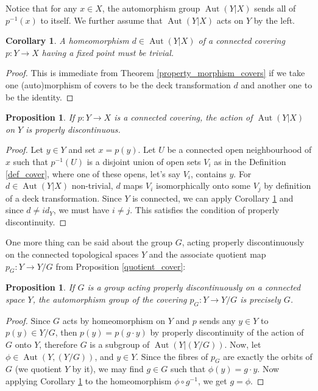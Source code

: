 \documentclass{article}
\theoremstyle{plain}
\newtheorem{proposition}[theorem]{Proposition}
\newtheorem{corollary}[theorem]{Corollary}
\theoremstyle{definition}
\DeclareMathOperator{\Aut}{Aut}
\begin{document}
\noindent Notice that for any $x\in X$, the automorphism group $\Aut(Y|X)$ sends all of $p^{-1}(x)$ to itself. We further assume that $\Aut(Y|X)$ acts on $Y$ by the left.

\begin{corollary}
\label{corollary_property_morphism_covers}
    A homeomorphism $d\in \Aut(Y|X)$ of a connected covering $p:Y\rightarrow X$ having a fixed point must be trivial.
\end{corollary}
\begin{proof}
    This is immediate from Theorem \ref{property_morphism_covers} if we take one (auto)morphism of covers to be the deck transformation $d$ and another one to be the identity.
\end{proof}


    
\begin{proposition}
    If $p:Y\rightarrow X$ is a connected covering, the action of $\Aut(Y|X)$ on $Y$ is properly discontinuous.
\end{proposition}
\begin{proof}
    Let $y\in Y$ and set $x = p(y)$. Let $U$ be a connected open neighbourhood of $x$ such that $p^{-1}(U)$ is a disjoint union of open sets $V_i$ as in the Definition \ref{def_cover}, where one of these opens, let's say $V_i$, contains $y$. 
    For $d\in \Aut(Y|X)$ non-trivial, $d$ maps $V_i$ isomorphically onto some $V_j$ by definition of a deck transformation. Since $Y$ is connected, we can apply Corollary \ref{corollary_property_morphism_covers} and since $d\neq id_Y$, we must have $i\neq j$. This satisfies the condition of properly discontinuity.
\end{proof}

\noindent One more thing can be said about the group $G$, acting properly discontinuously on the connected topological spaces $Y$ and the associate quotient map $p_G:Y\rightarrow Y/G$ from Proposition \ref{quotient_cover}:

\begin{proposition}
\label{G_is_aut_group}
    If $G$ is a group acting properly discontinuously on a connected space $Y$, the automorphism group of the covering $p_G:Y\rightarrow Y/G$ is precisely $G$.
\end{proposition}
\begin{proof}
    Since $G$ acts by homeomorphism on $Y$ and $p$ sends any $y\in Y$ to $p(y)\in Y/G$, then $p(y) = p(g\cdot y)$ by properly discontinuity of the action of $G$ onto $Y$, therefore $G$ is a subgroup of $\Aut(Y|(Y/G))$. 
    Now, let $\phi\in\Aut(Y, (Y/G))$, and $y\in Y$. Since the fibres of $p_G$ are exactly the orbits of $G$ (we quotient $Y$ by it), we may find $g\in G$ such that $\phi(y) = g\cdot y$. 
    Now applying Corollary \ref{corollary_property_morphism_covers} to the homeomorphism $\phi\circ g^{-1}$, we get $g=\phi$.
\end{proof}
\end{document}
